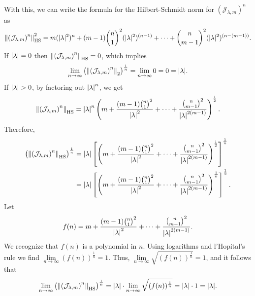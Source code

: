 \documentclass{article}
\begin{document}
With this, we can write the formula for the Hilbert-Schmidt norm for $(\mathcal{J}_{\lambda,m})^n$ as
\begin{align*}
\norm{\left(\mathcal{J}_{\lambda,m}\right)^n}_\text{HS}^2 =  m(|\lambda|^{2})^n  + (m-1){n\choose 1}^2(|{\lambda}|^{2})^{(n-1)} + \dots + {n\choose m-1}^2(|{  \lambda}|^{2})^{(n-(m-1))} .
\end{align*}
If $\abs{\lambda} = 0$ then $\norm{\left(\mathcal{J}_{\lambda,m}\right)^n}_\text{HS} = 0$, which implies 
\begin{align*}
\lim\limits_{n\to\infty} \left(\norm{\left(\mathcal{J}_{\lambda,m}\right)^n}_2\right)^{\frac{1}{n}} = \lim\limits_{n\to\infty} 0  = 0= \abs{\lambda}.
\end{align*}
If $\abs{\lambda} > 0$, by factoring out $\abs{\lambda}^n$, we get
\begin{align*}
\norm{\left(\mathcal{J}_{\lambda,m}\right)^n}_\text{HS} = \abs{\lambda}^n \left( m  + \frac{(m-1){n\choose 1}^2}{\abs{\lambda}^2} + \dots + \frac{{n\choose m-1}^2}{\abs{\lambda}^{2(m-1)}}  \right)^\frac{1}{2}.
\end{align*}
Therefore,
\begin{align*}
\left(  \norm{\left(\mathcal{J}_{\lambda,m}\right)^n}_\text{HS} \right)^{\frac{1}{n}} &= \abs{\lambda}\left[\left( m  + \frac{(m-1){n\choose 1}^2}{\abs{\lambda}^2} + \dots + \frac{{n\choose m-1}^2}{\abs{\lambda}^{2(m-1)}}  \right)^\frac{1}{2}\right]^{\frac{1}{n}}\\
&= \abs{\lambda}\left[\left( m + \frac{(m-1){n\choose 1}^2}{\abs{\lambda}^2} + \dots + \frac{{n\choose m-1}^2}{\abs{\lambda}^{2(m-1)}}  \right)^\frac{1}{n}\right]^{\frac{1}{2}}.
\end{align*}
Let
\begin{align*}
f(n) = m  + \frac{(m-1){n\choose 1}^2}{\abs{\lambda}^2} + \dots + \frac{{n\choose m-1}^2}{\abs{\lambda}^{2(m-1)}}.
\end{align*}
We recognize that $f(n)$ is a polynomial in $n$. Using logarithms and l'Hopital's rule we find $\lim\limits_{n\to\infty} (f(n))^{\frac{1}{n}} = 1$. Thus, $\lim\limits_{n\to\infty} \sqrt{(f(n))^{\frac{1}{n}}} = 1$, and it follows that 
\begin{align*}
\lim\limits_{n\to\infty} \left(  \norm{\left(\mathcal{J}_{\lambda,m}\right)^n}_\text{HS} \right)^{\frac{1}{n}} = \abs{\lambda}\cdot\lim\limits_{n\to\infty}\sqrt{(f(n))^{\frac{1}{n}}} = \abs{\lambda}\cdot 1 = \abs{\lambda}.
\end{align*}
\end{document}
